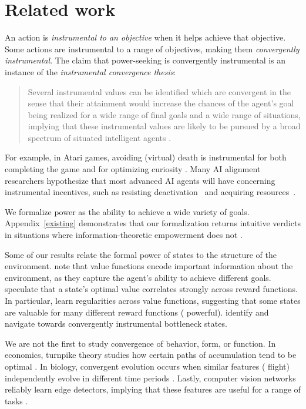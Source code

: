 \section{Related work}\label{sec:prior}
An action is \emph{instrumental to an objective} when it helps achieve that objective. Some actions are instrumental to a range of objectives, making them \emph{convergently instrumental}. The claim that power-seeking is convergently instrumental is an instance of the \emph{instrumental convergence thesis}:
\begin{quote}
    Several instrumental values can be identified which are convergent in the sense that their attainment would increase the chances of the agent's goal being realized for a wide range of final goals and a wide range of situations, implying that these instrumental values are likely to be pursued by a broad spectrum of situated intelligent agents \citep{bostrom2012superintelligent}.
\end{quote}

For example, in Atari games, avoiding (virtual) death is instrumental  for both completing the game and for optimizing curiosity \citep{burda2018largescale}. Many AI alignment researchers hypothesize that most advanced AI agents will have concerning instrumental incentives, such as resisting deactivation~\citep{soares_corrigibility_2015,milli2017should,off_switch,carey_incorrigibility_2017} and acquiring resources~\citep{benson-tilsen_formalizing_2016}. 

We formalize power as the ability to achieve a wide variety of goals. Appendix~\ref{existing} demonstrates that our formalization returns intuitive verdicts in situations where information-theoretic empowerment does not \citep{salge_empowermentintroduction_2014}. 

Some of our results relate the formal power of states to the structure of the environment. \citet{foster_structure_2002, drummond_composing_1998,sutton_horde:_2011,schaul_universal_2015} note that value functions encode important information about the environment, as they capture the agent's ability to achieve different goals. \citet{turner2020conservative} speculate that a state's optimal value correlates strongly across reward functions. In particular, \citet{schaul_universal_2015} learn regularities across value functions, suggesting that some states are valuable for many different reward functions (\ie{} powerful). \citet{menache2002q} identify and navigate towards convergently instrumental bottleneck states.

We are not the first to study convergence of behavior, form, or function. In economics, turnpike theory studies how certain paths of accumulation tend to be optimal \citep{mckenzie_turnpike_1976}. In biology, convergent evolution occurs when similar features (\eg{} flight) independently evolve in different time periods \citep{reece2011campbell}. Lastly, computer vision networks reliably learn \eg{} edge detectors, implying that these features are useful for a range of tasks \citep{olah2020zoom}. 